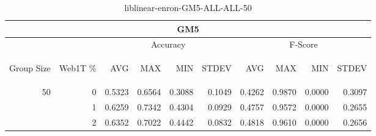 \begin{center}
\begin{table}[htbp]
\begin{tabular}{ | r | r | r | r | r | r | r | r | r | r |}
\hline
\multicolumn{10}{|c|}{GM5}\\
\hline
 & & \multicolumn{4}{|c|}{Accuracy} & \multicolumn{4}{|c|}{F-Score}\\ \cline{3-10}
\begin{sideways}Group Size\end{sideways} & \begin{sideways}Web1T \%\end{sideways} & \begin{sideways}AVG\end{sideways} & \begin{sideways}MAX\end{sideways} & \begin{sideways}MIN\end{sideways} & \begin{sideways}STDEV\end{sideways} & \begin{sideways}AVG\end{sideways} & \begin{sideways}MAX\end{sideways} & \begin{sideways}MIN\end{sideways} & \begin{sideways}STDEV\end{sideways}\\
\hline
\multirow{3}{*}{50}
 & 0 & 0.5323 & 0.6564 & 0.3088 & 0.1049 & 0.4262 & 0.9870 & 0.0000 & 0.3097\\ \cline{2-10}
 & 1 & 0.6259 & 0.7342 & 0.4304 & 0.0929 & 0.4757 & 0.9572 & 0.0000 & 0.2655\\ \cline{2-10}
 & 2 & 0.6352 & 0.7022 & 0.4442 & 0.0832 & 0.4818 & 0.9610 & 0.0000 & 0.2656\\ \cline{2-10}
\hline
\end{tabular}
\caption{liblinear-enron-GM5-ALL-ALL-50}
\end{table}
\end{center}

